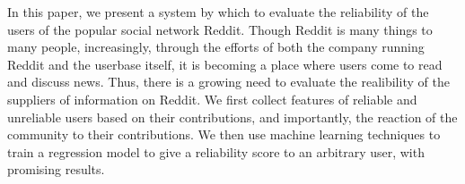 In this paper, we present a system by which to evaluate the reliability of the
users of the popular social network Reddit. Though Reddit is many things to many
people, increasingly, through the efforts of both the company running Reddit and
the userbase itself, it is becoming a place where users come to read and discuss
news. Thus, there is a growing need to evaluate the realibility of the suppliers
of information on Reddit. We first collect features of reliable and unreliable
users based on their contributions, and importantly, the reaction of the
community to their contributions. We then use machine learning techniques to
train a regression model to give a reliability score to an arbitrary user, with
promising results.
